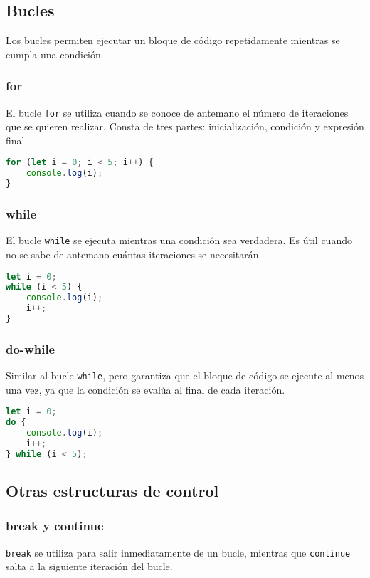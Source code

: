 \documentclass{book}
\begin{document}
\subsection{Bucles}

Los bucles permiten ejecutar un bloque de código repetidamente mientras se cumpla una condición.

\subsubsection{for}
El bucle \texttt{for} se utiliza cuando se conoce de antemano el número de iteraciones que se quieren realizar. Consta de tres partes: inicialización, condición y expresión final.

\begin{lstlisting}[language=JavaScript]
for (let i = 0; i < 5; i++) {
    console.log(i);
}
\end{lstlisting}

\subsubsection{while}
El bucle \texttt{while} se ejecuta mientras una condición sea verdadera. Es útil cuando no se sabe de antemano cuántas iteraciones se necesitarán.

\begin{lstlisting}[language=JavaScript]
let i = 0;
while (i < 5) {
    console.log(i);
    i++;
}
\end{lstlisting}

\subsubsection{do-while}
Similar al bucle \texttt{while}, pero garantiza que el bloque de código se ejecute al menos una vez, ya que la condición se evalúa al final de cada iteración.

\begin{lstlisting}[language=JavaScript]
let i = 0;
do {
    console.log(i);
    i++;
} while (i < 5);
\end{lstlisting}

\subsection{Otras estructuras de control}

\subsubsection{break y continue}
\texttt{break} se utiliza para salir inmediatamente de un bucle, mientras que \texttt{continue} salta a la siguiente iteración del bucle.
\end{document}
